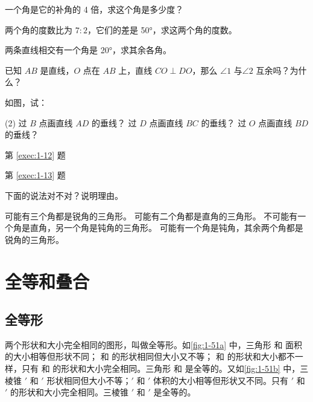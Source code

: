 \begin{Exercise}
\begin{question}
	\item 一个角是它的补角的 4 倍，求这个角是多少度？
	\item 两个角的度数比为 $7:2$，它们的差是 \ang{50}，求这两个角的度数。
	\item 两条直线相交有一个角是 \ang{20}，求其余各角。
	\item\label{exec:1-12} 已知 $AB$ 是直线，$O$ 点在 $AB$ 上，直线 $CO\perp DO$，那么 $\angle 1$ 与$\angle 2$ 互余吗？为什么？
	\item\label{exec:1-13} 如图，试：
	\begin{tasks}(2)
		\task 过 $B$ 点画直线 $AD$ 的垂线？
		\task 过 $D$ 点画直线 $BC$ 的垂线？
		\task 过 $O$ 点画直线 $BD$ 的垂线？
	\end{tasks}
	\begin{figurehere}
		\begin{minipage}[b]{0.48\linewidth}
			\centering
			\caption*{第 \ref{exec:1-12} 题}
		\end{minipage}
		\begin{minipage}[b]{0.48\linewidth}
			\centering
			\caption*{第 \ref{exec:1-13} 题}
		\end{minipage}
	\end{figurehere}
	\item 下面的说法对不对？说明理由。
	\begin{tasks}
		\task 可能有三个角都是锐角的三角形。
		\task 可能有二个角都是直角的三角形。
		\task 不可能有一个角是直角，另一个角是钝角的三角形。
		\task 可能有一个角是钝角，其余两个角都是锐角的三角形。
	\end{tasks}
\end{question}
\end{Exercise}

\section{全等和叠合}
\subsection{全等形}
两个形状和大小完全相同的图形，叫做全等形。如\cref{fig:1-51a} 中，三角形  和  面积的大小相等但形状不同；  和  的形状相同但大小又不等；  和  的形状和大小都不一样，只有  和  的形状和大小完全相同。三角形  和  是全等的。又如\cref{fig:1-51b} 中，三棱锥 $'$ 和 $'$ 形状相同但大小不等；$'$ 和 $'$ 体积的大小相等但形状又不同。只有 $'$ 和 $'$ 的形状和大小完全相同。三棱锥 $'$ 和 $'$ 是全等的。

